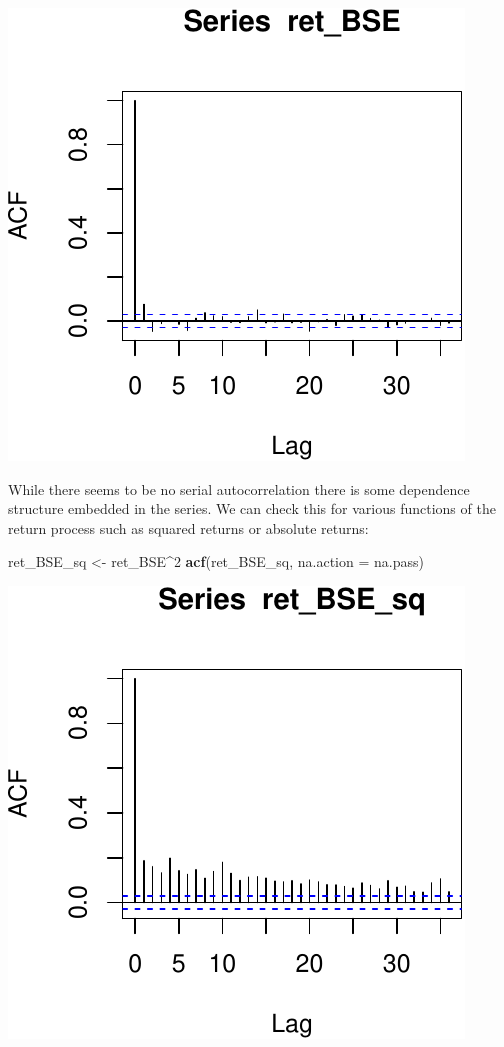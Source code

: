 \documentclass[11pt,]{article}
\newenvironment{Shaded}{\begin{snugshade}}{\end{snugshade}}
\newcommand{\KeywordTok}[1]{\textcolor[rgb]{0.13,0.29,0.53}{\textbf{#1}}}
\newcommand{\DataTypeTok}[1]{\textcolor[rgb]{0.13,0.29,0.53}{#1}}
\newcommand{\DecValTok}[1]{\textcolor[rgb]{0.00,0.00,0.81}{#1}}
\newcommand{\StringTok}[1]{\textcolor[rgb]{0.31,0.60,0.02}{#1}}
\newcommand{\OperatorTok}[1]{\textcolor[rgb]{0.81,0.36,0.00}{\textbf{#1}}}
\newcommand{\NormalTok}[1]{#1}
\begin{document}
\begin{center}\includegraphics{FMC_T4_PhD_ARMA_GARCH_files/figure-latex/BSE_ret_ACF-2} \end{center}

While there seems to be no serial autocorrelation there is some
dependence structure embedded in the series. We can check this for
various functions of the return process such as squared returns or
absolute returns:

\begin{Shaded}
\begin{Highlighting}[]
\NormalTok{ret_BSE_sq <-}\StringTok{ }\NormalTok{ret_BSE}\OperatorTok{^}\DecValTok{2}
\KeywordTok{acf}\NormalTok{(ret_BSE_sq, }\DataTypeTok{na.action =}\NormalTok{ na.pass)}
\end{Highlighting}
\end{Shaded}

\begin{center}\includegraphics{FMC_T4_PhD_ARMA_GARCH_files/figure-latex/BSE_ret_ACF_sq-1} \end{center}
\end{document}
